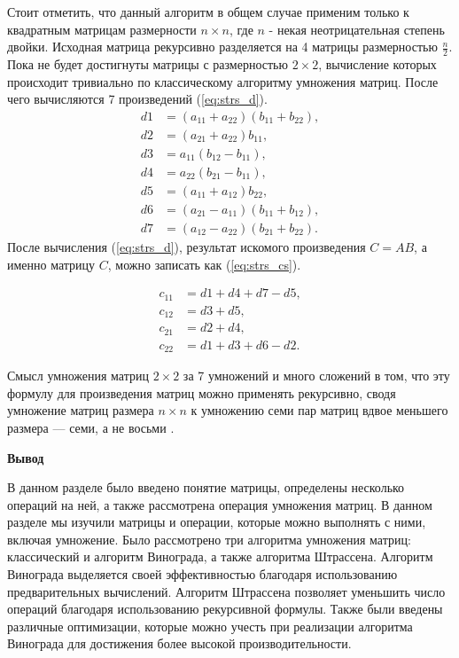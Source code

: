 Стоит отметить, что данный алгоритм в общем случае применим только к квадратным матрицам размерности $n\times n$, где $n$ - некая неотрицательная степень двойки.
Исходная матрица рекурсивно разделяется на 4 матрицы размерностью $\frac{n}{2}$.
Пока не будет достигнуты матрицы с размерностью $2\times2$, вычисление которых происходит тривиально по классическому алгоритму умножения матриц. После чего вычисляются 7 произведений (\ref{eq:strs_d}).
\begin{equation}
	\label{eq:strs_d}
	\begin{aligned}
		d1 & = (a_{11} + a_{22})(b_{11}+b_{22}), \\
		d2 & = (a_{21} + a_{22})b_{11}, \\
		d3 & = a_{11}(b_{12}-b_{11}), \\
		d4 & = a_{22}(b_{21} - b_{11}),\\
		d5 & = (a_{11}+a_{12})b_{22}, \\
		d6 & = (a_{21} - a_{11})(b_{11} + b_{12}), \\
		d7 & = (a_{12} - a_{22})(b_{21} + b_{22}).
	\end{aligned}
\end{equation}
После вычисления (\ref{eq:strs_d}), результат искомого произведения $C=AB$, а именно
матрицу $C$, можно записать как (\ref{eq:strs_cs}).


\begin{equation}
	\label{eq:strs_cs}
	\begin{aligned}
		c_{11} & = d1 + d4 + d7 -d5, \\
		c_{12} & = d3 + d5, \\
		c_{21} & = d2 + d4, \\
		c_{22} & = d1 + d3 + d6 -d2.
	\end{aligned}
\end{equation}

Смысл умножения матриц $2\times2$ за 7 умножений и много сложений в том, что эту формулу для произведения
матриц можно применять рекурсивно, сводя умножение матриц размера $n\times n$ к умножению
семи пар матриц вдвое меньшего размера — семи, а не восьми \cite{stras}.




\textbf{Вывод}

В данном разделе было введено понятие матрицы, определены несколько операций на ней, 
а также рассмотрена операция умножения матриц.
В данном разделе мы изучили матрицы и операции, 
которые можно выполнять с ними, включая умножение. 
Было рассмотрено три алгоритма умножения матриц: классический и алгоритм Винограда, а также алгоритма Штрассена.
Алгоритм Винограда выделяется своей эффективностью благодаря использованию предварительных вычислений.
Алгоритм Штрассена позволяет уменьшить число операций благодаря использованию рекурсивной формулы.
Также были введены  различные оптимизации, которые можно учесть при реализации алгоритма Винограда для 
достижения более высокой производительности.